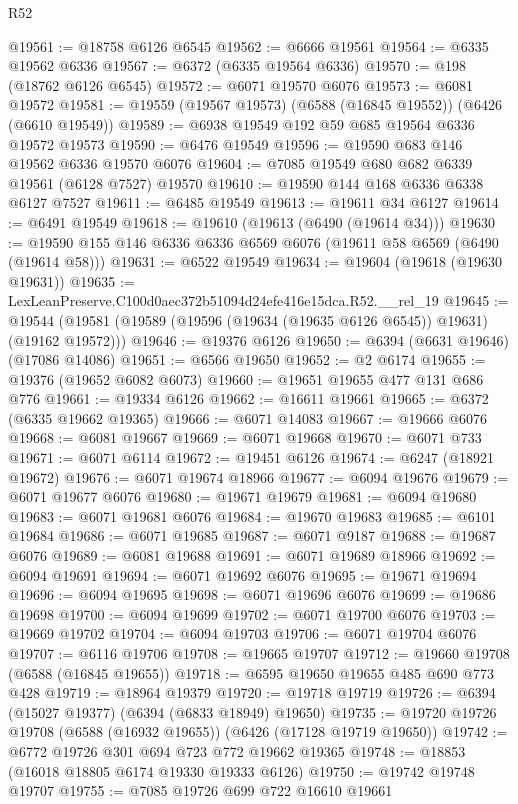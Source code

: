 \begin{lexlean}{R52}
\begin{coremodule}
@19561 := @18758 @6126 @6545
@19562 := @6666 @19561
@19564 := @6335 @19562 @6336
@19567 := @6372 (@6335 @19564 @6336)
@19570 := @198 (@18762 @6126 @6545)
@19572 := @6071 @19570 @6076
@19573 := @6081 @19572
@19581 := @19559 (@19567 @19573) (@6588 (@16845 @19552)) (@6426 (@6610 @19549))
@19589 := @6938 @19549 @192 @59 @685 @19564 @6336 @19572 @19573
@19590 := @6476 @19549
@19596 := @19590 @683 @146 @19562 @6336 @19570 @6076
@19604 := @7085 @19549 @680 @682 @6339 @19561 (@6128 @7527) @19570
@19610 := @19590 @144 @168 @6336 @6338 @6127 @7527
@19611 := @6485 @19549
@19613 := @19611 @34 @6127
@19614 := @6491 @19549
@19618 := @19610 (@19613 (@6490 (@19614 @34)))
@19630 := @19590 @155 @146 @6336 @6336 @6569 @6076 (@19611 @58 @6569 (@6490 (@19614 @58)))
@19631 := @6522 @19549
@19634 := @19604 (@19618 (@19630 @19631))
@19635 := LexLeanPreserve.C100d0aec372b51094d24efe416e15dca.R52.__rel_19
@19645 := @19544 (@19581 (@19589 (@19596 (@19634 (@19635 @6126 @6545)) @19631) (@19162 @19572)))
@19646 := @19376 @6126
@19650 := @6394 (@6631 @19646) (@17086 @14086)
@19651 := @6566 @19650
@19652 := @2 @6174
@19655 := @19376 (@19652 @6082 @6073)
@19660 := @19651 @19655 @477 @131 @686 @776
@19661 := @19334 @6126
@19662 := @16611 @19661
@19665 := @6372 (@6335 @19662 @19365)
@19666 := @6071 @14083
@19667 := @19666 @6076
@19668 := @6081 @19667
@19669 := @6071 @19668
@19670 := @6071 @733
@19671 := @6071 @6114
@19672 := @19451 @6126
@19674 := @6247 (@18921 @19672)
@19676 := @6071 @19674 @18966
@19677 := @6094 @19676
@19679 := @6071 @19677 @6076
@19680 := @19671 @19679
@19681 := @6094 @19680
@19683 := @6071 @19681 @6076
@19684 := @19670 @19683
@19685 := @6101 @19684
@19686 := @6071 @19685
@19687 := @6071 @9187
@19688 := @19687 @6076
@19689 := @6081 @19688
@19691 := @6071 @19689 @18966
@19692 := @6094 @19691
@19694 := @6071 @19692 @6076
@19695 := @19671 @19694
@19696 := @6094 @19695
@19698 := @6071 @19696 @6076
@19699 := @19686 @19698
@19700 := @6094 @19699
@19702 := @6071 @19700 @6076
@19703 := @19669 @19702
@19704 := @6094 @19703
@19706 := @6071 @19704 @6076
@19707 := @6116 @19706
@19708 := @19665 @19707
@19712 := @19660 @19708 (@6588 (@16845 @19655))
@19718 := @6595 @19650 @19655 @485 @690 @773 @428
@19719 := @18964 @19379
@19720 := @19718 @19719
@19726 := @6394 (@15027 @19377) (@6394 (@6833 @18949) @19650)
@19735 := @19720 @19726 @19708 (@6588 (@16932 @19655)) (@6426 (@17128 @19719 @19650))
@19742 := @6772 @19726 @301 @694 @723 @772 @19662 @19365
@19748 := @18853 (@16018 @18805 @6174 @19330 @19333 @6126)
@19750 := @19742 @19748 @19707
@19755 := @7085 @19726 @699 @722 @16610 @19661

\end{coremodule}
\end{lexlean}
